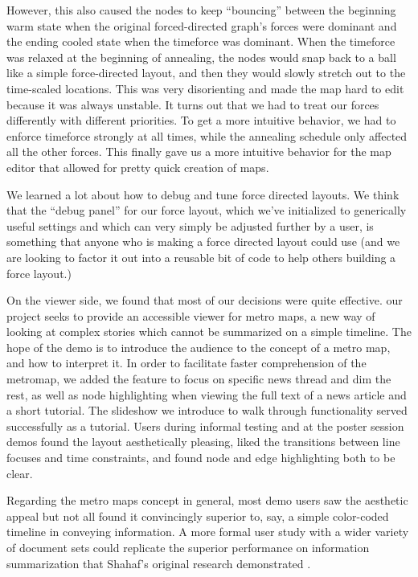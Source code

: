 \documentclass{chi2009}
\begin{document}
However, this also caused the nodes to keep “bouncing” between the beginning warm state when the original forced-directed graph’s forces were dominant and the ending cooled state when the timeforce was dominant.  When the timeforce was relaxed at the beginning of annealing, the nodes would snap back to a ball like a simple force-directed layout, and then they would slowly stretch out to the time-scaled locations.  This was very disorienting and made the map hard to edit because it was always unstable.  
    It turns out that we had to treat our forces differently with different priorities.  To get a more intuitive behavior, we had to enforce timeforce strongly at all times, while the annealing schedule only affected all the other forces.  This finally gave us a more intuitive behavior for the map editor that allowed for pretty quick creation of maps.  

We learned a lot about how to debug and tune force directed layouts. We think that the “debug panel” for our force layout, which we’ve initialized to generically useful settings and which can very simply be adjusted further by a user, is something that anyone who is making a force directed layout could use (and we are looking to factor it out into a reusable bit of code to help others building a force layout.)

On the viewer side, we found that most of our decisions were quite effective. our project seeks to provide an accessible viewer for metro maps, a new way of looking at complex stories which cannot be summarized on a simple timeline. The hope of the demo is to introduce the audience to the concept of a metro map, and how to interpret it.  In order to facilitate faster comprehension of the metromap, we added the feature to focus on specific news thread and dim the rest, as well as node highlighting when viewing the full text of a news article and a short tutorial.   The slideshow we introduce to walk through functionality served successfully as a tutorial. Users during informal testing and at the poster session demos found the layout aesthetically pleasing, liked the transitions between line focuses and time constraints, and found node and edge highlighting both to be clear.

Regarding the metro maps concept in general, most demo users saw the aesthetic appeal but not all found it convincingly superior to, say, a simple color-coded timeline in conveying information. A more formal user study with a wider variety of document sets could replicate the superior performance on information summarization that Shahaf’s original research demonstrated \cite{}.
\end{document}
